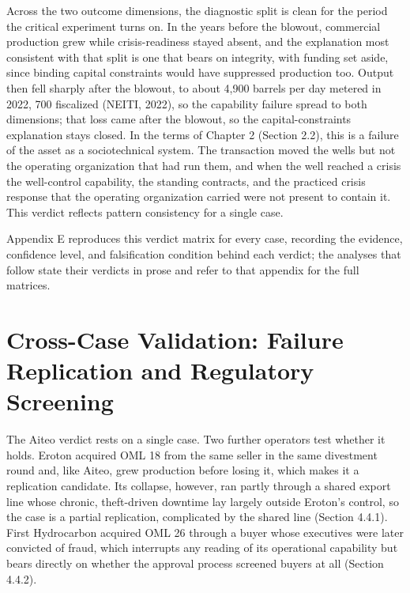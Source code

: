 Across the two outcome dimensions, the diagnostic split is clean for the
period the critical experiment turns on. In the years before the
blowout, commercial production grew while crisis-readiness stayed
absent, and the explanation most consistent with that split is one that
bears on integrity, with funding set aside, since binding capital
constraints would have suppressed production too. Output then fell
sharply after the blowout, to about 4,900 barrels per day metered in
2022, 700 fiscalized (NEITI, 2022), so the capability failure spread to
both dimensions; that loss came after the blowout, so the
capital-constraints explanation stays closed. In the terms of Chapter 2
(Section 2.2), this is a failure of the asset as a sociotechnical
system. The transaction moved the wells but not the operating
organization that had run them, and when the well reached a crisis the
well-control capability, the standing contracts, and the practiced
crisis response that the operating organization carried were not present
to contain it. This verdict reflects pattern consistency for a single
case.

Appendix E reproduces this verdict matrix for every case, recording the
evidence, confidence level, and falsification condition behind each
verdict; the analyses that follow state their verdicts in prose and
refer to that appendix for the full matrices.

\hypertarget{cross-case-validation-failure-replication-and-regulatory-screening}{%
\section{Cross-Case Validation: Failure Replication and Regulatory
Screening}\label{cross-case-validation-failure-replication-and-regulatory-screening}}

The Aiteo verdict rests on a single case. Two further operators test
whether it holds. Eroton acquired OML 18 from the same seller in the
same divestment round and, like Aiteo, grew production before losing it,
which makes it a replication candidate. Its collapse, however, ran
partly through a shared export line whose chronic, theft-driven downtime
lay largely outside Eroton's control, so the case is a partial
replication, complicated by the shared line (Section 4.4.1). First
Hydrocarbon acquired OML 26 through a buyer whose executives were later
convicted of fraud, which interrupts any reading of its operational
capability but bears directly on whether the approval process screened
buyers at all (Section 4.4.2).

